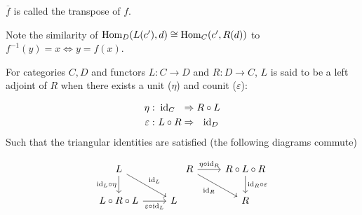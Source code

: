 \begin{remark}
  $\overline{f}$ is called the transpose of $f$.
\end{remark}

\begin{remark}
  Note the similarity of $\mathrm{Hom}_D(L(c'), d)\cong \mathrm{Hom}_C(c', R(d))$ to
  $f^{-1}(y)=x \iff y=f(x)$.
\end{remark}

\begin{definition}\label{def:adjoint_unit_counit}
  For categories $C,D$ and functors $L: C\to D$ and $R: D\to C$, $L$ is said to
  be a left adjoint of $R$ when there exists a unit ($\eta$) and counit
  ($\varepsilon$): \parencite{leinster:basic_category_theory}

  \[
    \begin{aligned}
      \eta&:\\
      \varepsilon&:
    \end{aligned}
    \ \begin{aligned}
      \mathrm{id}_C\ \ &\Rightarrow R \circ L\\
      L \circ R &\Rightarrow\ \ \mathrm{id}_D
    \end{aligned}
  \]
  Such that the triangular identities are satisfied (the following diagrams
  commute)

  \[\begin{tikzcd} L \\
    {L\circ R\circ L} & L
    \arrow["{\id_L\circ\eta}"', from=1-1, to=2-1]
    \arrow["{\varepsilon\circ \id_L}"', from=2-1, to=2-2]
    \arrow["{\id_L}", from=1-1, to=2-2]
  \end{tikzcd}
  \begin{tikzcd}
    R & {R\circ L\circ R} \\
    & R
    \arrow["{\eta\circ\id_R}", from=1-1, to=1-2]
    \arrow["{\id_R \circ \varepsilon}", from=1-2, to=2-2]
    \arrow["{\id_R}"', from=1-1, to=2-2]
  \end{tikzcd}\]
\end{definition}

